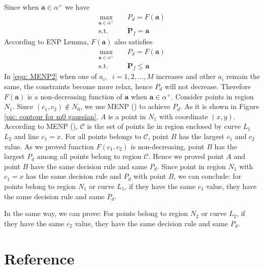 \documentclass[12pt,journal,a4paper,twoside,onecolumn]{IEEEtran}
\newcommand{\rmnum}[1]{\romannumeral #1}
\begin{document}
\begin{spacing}{2.5}
Since when $\mathbf{a} \in \alpha^+$ we have 
\begin{equation}
\begin{split}
\max_{\mathbf{a}\in \alpha^+}\;\;\;\;&P_d = F(\mathbf{a})\\
\text{s.t.}\;\;\;\;&\mathbf{P}_f = \mathbf{a}
\end{split}
\end{equation}
According to ENP Lemma, $F(\mathbf{a})$ also satisfies
\begin{equation}
\begin{split}
\label{equ: MENP2}
\max_{\mathbf{a}\in \alpha^+}\;\;\;\;&P_d = F(\mathbf{a})\\
\text{s.t.}\;\;\;\;&\mathbf{P}_f \leq \mathbf{a}
\end{split}
\end{equation}
In \eqref{equ: MENP2} when one of $a_i,\;\; i = 1, 2, ..., M$ increases and other $a_i$ remain the same, the constraints become more relax, hence $P_d$ will not decrease. Therefore $F(\mathbf{a})$ is a non-decreasing function of $\mathbf{a}$ when $\mathbf{a} \in \alpha^+$. 
Consider points in region $N_1$. Since $(c_1, c_2) \notin N_0$, we use MENP (\rmnum{2}) to achieve $P_d$. As it is shown in Figure \ref{pic: contour for m0 gaussian}, $A$ is a point in $N_1$ with coordinate $(x, y)$. According to MENP (\rmnum{2}), $\mathcal{C}$ is the set of points lie in region enclosed by curve $L_1$ $L_2$ and line $c_1 = x$. For all points belongs to $\mathcal{C}$, point $B$ has the largest $c_1$ and $c_2$ value. As we proved function $F(c_1, c_2)$ is non-decreasing, point $B$ has the largest $P_d$ among all points belong to region $\mathcal{C}$. Hence we proved point $A$ and point $B$ have the same decision rule and same $P_d$. Since point in region $N_1$ with $c_1 = x$ has the same decision rule and $P_d$ with point $B$, we can conclude: for points belong to region $N_1$ or curve $L_1$, if they have the same $c_1$ value, they have the same decision rule and same $P_d$.

In the same way, we can prove: For points belong to region $N_2$ or curve $L_2$, if they have the same $c_2$ value, they have the same decision rule and same $P_d$.

\section{Reference}
\newpage


\end{spacing}
\end{document}
